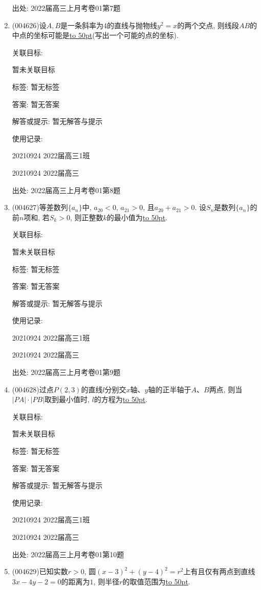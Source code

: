 \documentclass[10pt,a4paper]{article}
\newcommand{\blank}[1]{\underline{\hbox to #1pt{}}}
\begin{document}
\begin{enumerate}[1.]
出处: 2022届高三上月考卷01第7题
\item { (004626)}设$A,B$是一条斜率为$4$的直线与抛物线$y^2=x$的两个交点, 则线段$AB$的中点的坐标可能是\blank{50}(写出一个可能的点的坐标).


关联目标:

暂未关联目标



标签: 暂无标签

答案: 暂无答案

解答或提示: 暂无解答与提示

使用记录:

20210924	2022届高三1班	

20210924	2022届高三	


出处: 2022届高三上月考卷01第8题
\item { (004627)}等差数列$\{a_n\}$中, $a_{20}<0$, $a_{21}>0$, 且$a_{20}+a_{21}>0$. 设$S_n$是数列$\{a_n\}$的前$n$项和, 若$S_k>0$, 则正整数$k$的最小值为\blank{50}.


关联目标:

暂未关联目标



标签: 暂无标签

答案: 暂无答案

解答或提示: 暂无解答与提示

使用记录:

20210924	2022届高三1班	

20210924	2022届高三	


出处: 2022届高三上月考卷01第9题
\item { (004628)}过点$P(2,3)$的直线$l$分别交$x$轴、$y$轴的正半轴于$A$、$B$两点, 则当$|PA|\cdot|PB|$取到最小值时, $l$的方程为\blank{50}.


关联目标:

暂未关联目标



标签: 暂无标签

答案: 暂无答案

解答或提示: 暂无解答与提示

使用记录:

20210924	2022届高三1班	

20210924	2022届高三	


出处: 2022届高三上月考卷01第10题
\item { (004629)}已知实数$r>0$, 圆$(x-3)^2+(y-4)^2=r^2$上有且仅有两点到直线$3x-4y-2=0$的距离为$1$, 则半径$r$的取值范围为\blank{50}.



\end{enumerate}
\end{document}

